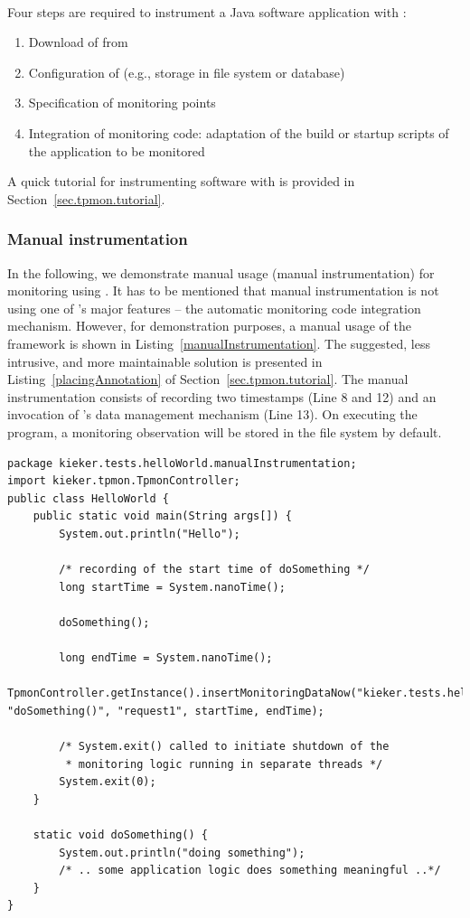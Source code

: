 \documentclass[a4paper,12pt]{scrartcl}
\begin{document}
\

Four steps are required to instrument a Java software application with \tpmon{}:
\begin{enumerate}
\item Download of \tpmon{} from \kiekerurl{}
\item Configuration of \tpmon{} (e.g., storage in file system or database)
\item Specification of monitoring points
\item Integration of monitoring code: adaptation of the build or startup scripts of the application to be monitored
\end{enumerate}

\noindent
A quick tutorial for instrumenting software with \tpmon{} is provided in Section~\ref{sec.tpmon.tutorial}.

\subsubsection{Manual instrumentation}
In the following, we demonstrate manual usage (manual instrumentation) for monitoring using \tpmon{}. It has to be mentioned that manual instrumentation is not using one of \tpmon{}'s major features -- the automatic monitoring code integration mechanism. However, for demonstration purposes, a manual usage of the \tpmon{} framework is shown in Listing~\ref{manualInstrumentation}. The suggested, less intrusive, and more maintainable solution is presented in Listing~\ref{placingAnnotation} of Section~\ref{sec.tpmon.tutorial}. The manual instrumentation consists of recording two timestamps (Line 8 and 12) and an invocation of \tpmon{}'s data management mechanism (Line 13). On executing the program, a monitoring observation will be stored in the file system by default.

\begin{lstlisting}[caption={\footnotesize\texttt{src/kieker/tests/helloWorld/manualInstrumentation/HelloWorld.java}},label={manualInstrumentation}]
package kieker.tests.helloWorld.manualInstrumentation;
import kieker.tpmon.TpmonController;
public class HelloWorld {
    public static void main(String args[]) {
        System.out.println("Hello");

        /* recording of the start time of doSomething */
        long startTime = System.nanoTime();

        doSomething();

        long endTime = System.nanoTime();
        TpmonController.getInstance().insertMonitoringDataNow("kieker.tests.helloWorld.manualInstrumentation.HelloWorld", "doSomething()", "request1", startTime, endTime);

        /* System.exit() called to initiate shutdown of the
         * monitoring logic running in separate threads */
        System.exit(0);
    }

    static void doSomething() {
        System.out.println("doing something");
        /* .. some application logic does something meaningful ..*/
    }
}
\end{lstlisting}
\end{document}
